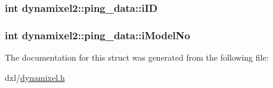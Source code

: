 \subsubsection[{i\+I\+D}]{\setlength{\rightskip}{0pt plus 5cm}int dynamixel2\+::ping\+\_\+data\+::i\+I\+D}\label{structdynamixel2_1_1ping__data_a7c8829a586a920b2abe49719957abd37}
\hypertarget{structdynamixel2_1_1ping__data_a1786b3e1400d2ff8b8361b367b52fbb7}{}
\subsubsection[{i\+Model\+No}]{\setlength{\rightskip}{0pt plus 5cm}int dynamixel2\+::ping\+\_\+data\+::i\+Model\+No}\label{structdynamixel2_1_1ping__data_a1786b3e1400d2ff8b8361b367b52fbb7}


The documentation for this struct was generated from the following file\+:\begin{DoxyCompactItemize}
\item 
dxl/\hyperlink{dynamixel_8h}{dynamixel.\+h}\end{DoxyCompactItemize}
